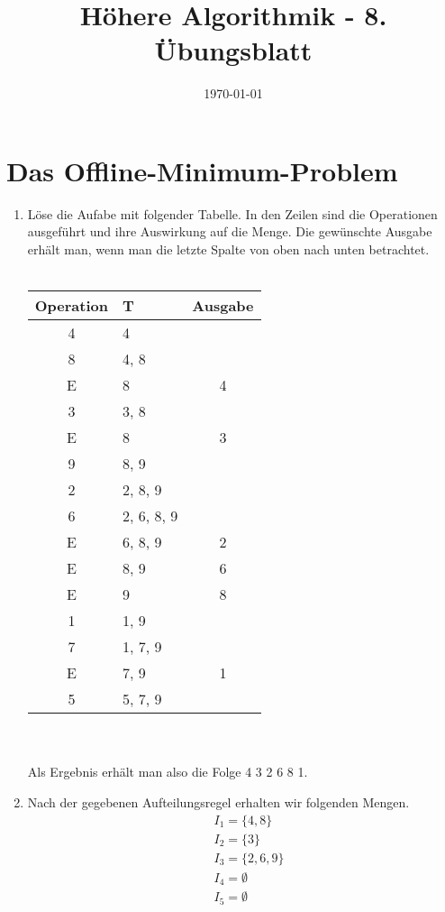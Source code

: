 \documentclass[a4paper,10pt]{article}
\title{H\"ohere Algorithmik - 8. \"Ubungsblatt}
\author{\Authors}
\date{\today}
\begin{document}
\maketitle

\section{Das Offline-Minimum-Problem}
\begin{enumerate}
\item  Löse die Aufabe mit folgender Tabelle. In den Zeilen sind die Operationen ausgeführt und ihre Auswirkung auf die Menge. Die gewünschte Ausgabe erhält man, wenn man die letzte Spalte von oben nach unten betrachtet.\\ \\
	\begin{tabular}{ c | l | c }
	\textbf{Operation} & \textbf{T} & \textbf{Ausgabe} \\
	\hline
	4 & 4 & \\
	\hline
	8 & 4, 8 & \\
	\hline
	E & 8 & 4 \\
	\hline
	3 & 3, 8 & \\
	\hline
	E & 8 & 3 \\
	\hline
	9 & 8, 9 & \\
	\hline
	2 & 2, 8, 9 & \\
	\hline
	6 & 2, 6, 8, 9 & \\
	\hline
	E & 6, 8, 9 & 2 \\
	\hline
	E & 8, 9 & 6 \\
	\hline
	E & 9 & 8 \\
	\hline
	1 & 1, 9 & \\
	\hline
	7 & 1, 7, 9 & \\
	\hline
	E & 7, 9 & 1 \\
	\hline
	5 & 5, 7, 9 & \\
	\hline
	\end{tabular}\\ \\
	Als Ergebnis erhält man also die Folge 4 3 2 6 8 1.
\item   Nach der gegebenen Aufteilungsregel erhalten wir folgenden Mengen.\begin{align*}
	&I_1 = \{4, 8\}\\
	&I_2 = \{3\}\\
	&I_3 =\{2, 6, 9\}\\
	&I_4 = \emptyset \\
	&I_5 = \emptyset \\

\end{align*}
\end{enumerate}
\end{document}
